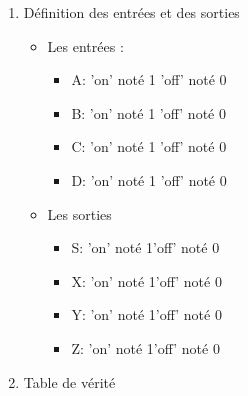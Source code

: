 \begin{enumerate}
\item Définition des entrées et des sorties 

\begin{itemize}
\item Les entrées :

\begin{itemize}
\item A: \qquad 'on' noté 1 \qquad 'off' noté 0
 

\item B: \qquad 'on' noté 1 \qquad 'off' noté 0
 

\item C: \qquad 'on' noté 1 \qquad 'off' noté 0
 

\item D: \qquad 'on' noté 1 \qquad 'off' noté 0
 

\end{itemize}
\item Les sorties 

\begin{itemize}
\item S: \qquad 'on' noté 1\qquad 'off' noté  0


\item X: \qquad 'on' noté 1\qquad 'off' noté  0


\item Y: \qquad 'on' noté 1\qquad 'off' noté  0


\item Z: \qquad 'on' noté 1\qquad 'off' noté  0


\end{itemize}
\end{itemize}
\item Table de vérité 


        \begin{tabular}{|c|c|c|c|c||c|c|c|c|}

    \toprule


\end{tabular}
\end{enumerate}
